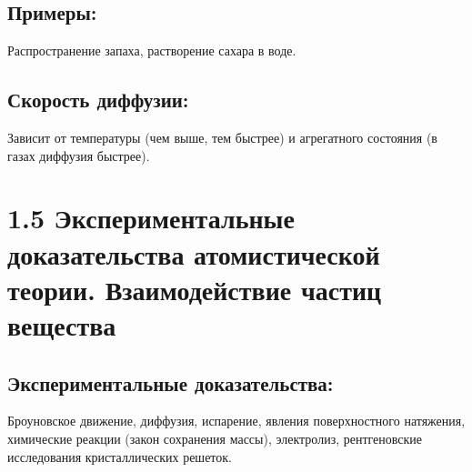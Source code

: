 \documentclass[a4paper,12pt]{article}
\begin{document}
\vspace{-9pt}
\subsection*{Примеры:}
\vspace{-3pt}
Распространение запаха, растворение сахара в воде.

\vspace{-9pt}
\subsection*{Скорость диффузии:}
\vspace{-3pt}
Зависит от температуры (чем выше, тем быстрее) и агрегатного состояния (в газах диффузия быстрее).


\section*{1.5 Экспериментальные доказательства атомистической теории. Взаимодействие частиц вещества}

\vspace{-9pt}
\subsection*{Экспериментальные доказательства:}
\vspace{-3pt} 
Броуновское движение, диффузия, испарение, явления поверхностного натяжения, химические реакции (закон сохранения массы), электролиз, рентгеновские исследования кристаллических решеток.

\vspace{-9pt}
\end{document}
